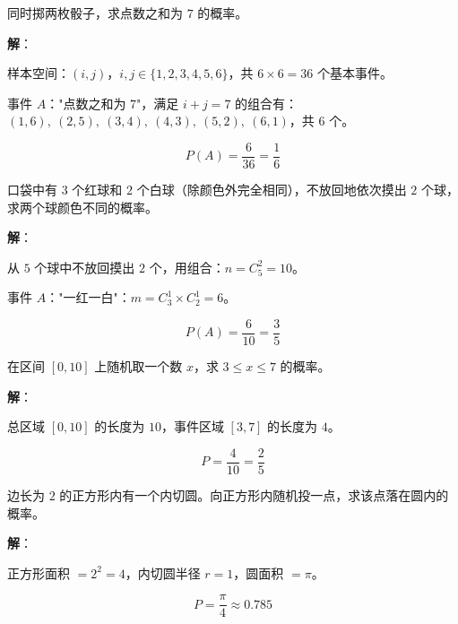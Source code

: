 \documentclass[12pt, a4paper]{ctexart}
\begin{document}
\begin{examplebox}
同时掷两枚骰子，求点数之和为 $7$ 的概率。
\end{examplebox}

\textbf{解}：

样本空间：$(i, j)$，$i, j \in \{1,2,3,4,5,6\}$，共 $6 \times 6 = 36$ 个基本事件。

事件 $A$："点数之和为 $7$"，满足 $i + j = 7$ 的组合有：$(1,6),\ (2,5),\ (3,4),\ (4,3),\ (5,2),\ (6,1)$，共 $6$ 个。

\[
P(A) = \frac{6}{36} = \frac{1}{6}
\]

\begin{examplebox}
口袋中有 $3$ 个红球和 $2$ 个白球（除颜色外完全相同），不放回地依次摸出 $2$ 个球，求两个球颜色不同的概率。
\end{examplebox}

\textbf{解}：

从 $5$ 个球中不放回摸出 $2$ 个，用组合：$n = C_5^2 = 10$。

事件 $A$："一红一白"：$m = C_3^1 \times C_2^1 = 6$。

\[
P(A) = \frac{6}{10} = \frac{3}{5}
\]

\begin{examplebox}
在区间 $[0, 10]$ 上随机取一个数 $x$，求 $3 \leqslant x \leqslant 7$ 的概率。
\end{examplebox}

\textbf{解}：

总区域 $[0, 10]$ 的长度为 $10$，事件区域 $[3, 7]$ 的长度为 $4$。

\[
P = \frac{4}{10} = \frac{2}{5}
\]

\begin{examplebox}
边长为 $2$ 的正方形内有一个内切圆。向正方形内随机投一点，求该点落在圆内的概率。
\end{examplebox}

\textbf{解}：

正方形面积 $= 2^2 = 4$，内切圆半径 $r = 1$，圆面积 $= \pi$。

\[
P = \frac{\pi}{4} \approx 0.785
\]

\begin{center}
\end{center}
\end{document}
